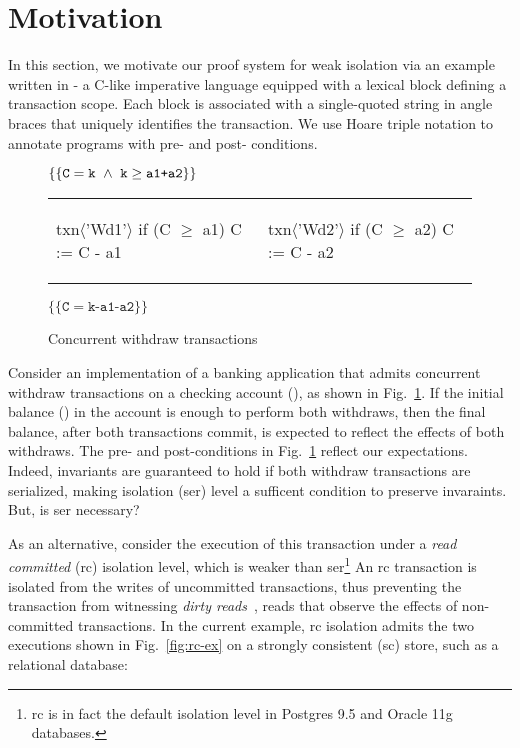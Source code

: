\section{Motivation}
\label{sec:motivation}

In this section, we motivate our proof system for weak isolation via
an example written in \txnimp - a C-like imperative language equipped
with a  lexical block defining a transaction scope. Each
 block is associated with a single-quoted string in angle
braces that uniquely identifies the transaction. We use Hoare triple
notation to annotate programs with pre- and post- conditions.

\begin{figure}
\centering
$\{\{\texttt{C}=\texttt{k} ~\wedge~ \texttt{k}\ge\texttt{a1+a2}\}\}$
\begin{tabular}{l||l}
\begin{txnimpcode}
  txn$\langle$'Wd1'$\rangle${
    if (C $\ge$ a1) {
      C := C - a1
    }
  }
\end{txnimpcode}
&
\begin{txnimpcode}
  txn$\langle$'Wd2'$\rangle${
    if (C $\ge$ a2) {
      C := C - a2
    }
  }
\end{txnimpcode}
\\
\end{tabular}
$\{\{\texttt{C}=\texttt{k-a1-a2}\}\}$

\caption{Concurrent withdraw transactions}
\label{fig:motiv-eg-1}
\end{figure}

Consider an implementation of a banking application that admits
concurrent withdraw transactions on a checking account (), as
shown in Fig.~\ref{fig:motiv-eg-1}. If the initial balance () in
the account is enough to perform both withdraws, then the final
balance, after both transactions commit, is expected to reflect the
effects of both withdraws. The pre- and post-conditions in
Fig.~\ref{fig:motiv-eg-1} reflect our expectations. Indeed, invariants
are guaranteed to hold if both withdraw transactions are serialized,
making  isolation ({\sc ser}) level a sufficent
condition to preserve invaraints. But, is {\sc ser} necessary?

As an alternative, consider the execution of this transaction under a
\emph{read committed} ({\sc rc}) isolation level, which is weaker than
     {\sc ser}\footnote{{\sc rc} is in fact the default isolation
       level in Postgres 9.5 and Oracle 11g databases.} An {\sc rc}
     transaction is isolated from the writes of uncommitted
     transactions, thus preventing the transaction from witnessing
     \emph{dirty reads}~\cite{berenson}, reads that observe the
     effects of non-committed transactions. In the current example,
     {\sc rc} isolation admits the two executions shown in
     Fig.~\ref{fig:rc-ex} on a strongly consistent ({\sc sc}) store,
     such as a relational database:

